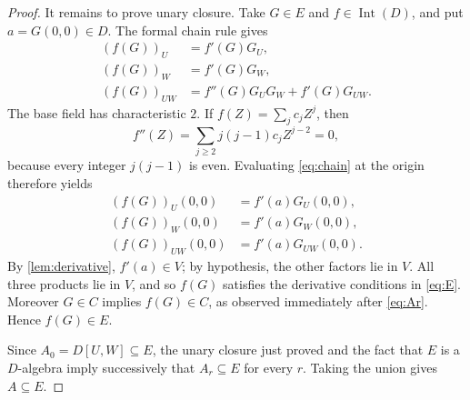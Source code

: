 \documentclass[10pt,a4paper]{amsart}
\newcommand{\Int}{\operatorname{Int}}
\begin{document}
\begin{proof}
It remains to prove unary closure.  Take \(G\in E\) and
\(f\in\Int(D)\), and put \(a=G(0,0)\in D\).  The formal chain rule
gives
\begin{equation}
 \begin{aligned}
 (f(G))_U&=f'(G)G_U,\\
 (f(G))_W&=f'(G)G_W,\\
 (f(G))_{UW}
   &=f''(G)G_UG_W+f'(G)G_{UW}.
 \end{aligned}
 \label{eq:chain}
\end{equation}
The base field has characteristic \(2\).  If
\(f(Z)=\sum_j c_jZ^j\), then
\[
 f''(Z)=\sum_{j\geq2}j(j-1)c_jZ^{j-2}=0,
\]
because every integer \(j(j-1)\) is even.  Evaluating
\eqref{eq:chain} at the origin therefore yields
\[
 \begin{aligned}
 (f(G))_U(0,0)&=f'(a)G_U(0,0),\\
 (f(G))_W(0,0)&=f'(a)G_W(0,0),\\
 (f(G))_{UW}(0,0)&=f'(a)G_{UW}(0,0).
 \end{aligned}
\]
By \cref{lem:derivative}, \(f'(a)\in V\); by hypothesis, the other
factors lie in \(V\).  All three products lie in \(V\), and so
\(f(G)\) satisfies the derivative conditions in \eqref{eq:E}.
Moreover \(G\in C\) implies \(f(G)\in C\), as observed immediately
after \eqref{eq:Ar}.  Hence \(f(G)\in E\).

Since \(A_0=D[U,W]\subseteq E\), the unary closure just proved and the
fact that \(E\) is a \(D\)-algebra imply successively that
\(A_r\subseteq E\) for every \(r\).  Taking the union gives
\(A\subseteq E\).
\end{proof}
\end{document}
